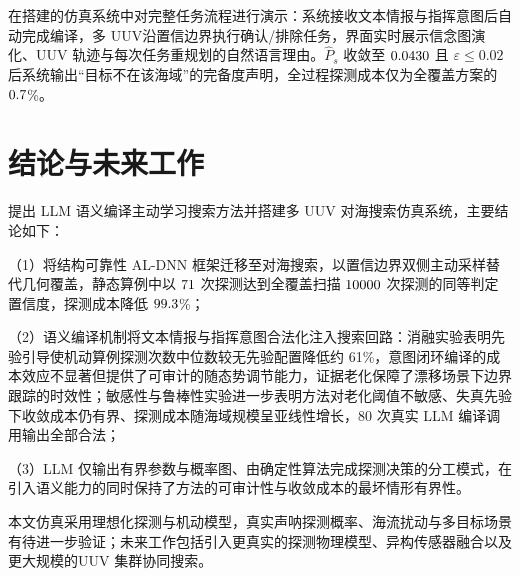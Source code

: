 \documentclass[a4paper,UTF8,zihao=5,twocolumn]{ctexart}
\numberwithin{equation}{section}
\begin{document}
在搭建的仿真系统中对完整任务流程进行演示：系统接收文本情报与指挥意图后自动完成编译，多 UUV沿置信边界执行确认/排除任务，界面实时展示信念图演化、UUV 轨迹与每次任务重规划的自然语言理由。$\hat P_s$ 收敛至 $0.0430$ 且 $\varepsilon\leq0.02$ 后系统输出“目标不在该海域”的完备度声明，全过程探测成本仅为全覆盖方案的 $0.7$\%。

\section{结论与未来工作}

提出 LLM 语义编译主动学习搜索方法并搭建多 UUV 对海搜索仿真系统，主要结论如下：

（1）将结构可靠性 AL-DNN 框架迁移至对海搜索，以置信边界双侧主动采样替代几何覆盖，静态算例中以 $71$ 次探测达到全覆盖扫描 $10000$ 次探测的同等判定置信度，探测成本降低 $99.3$\%；

（2）语义编译机制将文本情报与指挥意图合法化注入搜索回路：消融实验表明先验引导使机动算例探测次数中位数较无先验配置降低约 61\%，意图闭环编译的成本效应不显著但提供了可审计的随态势调节能力，证据老化保障了漂移场景下边界跟踪的时效性；敏感性与鲁棒性实验进一步表明方法对老化阈值不敏感、失真先验下收敛成本仍有界、探测成本随海域规模呈亚线性增长，80 次真实 LLM 编译调用输出全部合法；

（3）LLM 仅输出有界参数与概率图、由确定性算法完成探测决策的分工模式，在引入语义能力的同时保持了方法的可审计性与收敛成本的最坏情形有界性。

本文仿真采用理想化探测与机动模型，真实声呐探测概率、海流扰动与多目标场景有待进一步验证；未来工作包括引入更真实的探测物理模型、异构传感器融合以及更大规模的UUV 集群协同搜索。
\end{document}
